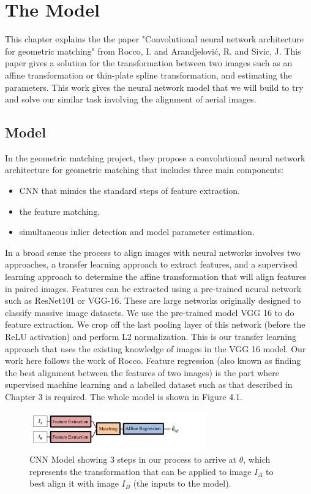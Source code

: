 \chapter{The Model}
This chapter explains the the paper "Convolutional neural network architecture for geometric matching\citep{Rocco17}" from Rocco, I. and Arandjelovi\'c, R. and Sivic, J. This paper gives a solution for the transformation between two images such as an affine transformation or thin-plate spline transformation, and estimating the parameters. This work gives the neural network model that we will build to try and solve our similar task involving the alignment of aerial images.

\section{Model}
In the geometric matching project\citep{Rocco17}, they propose a convolutional neural network architecture for geometric matching that includes three main components:
\begin{itemize}
\item CNN that mimics the standard steps of feature extraction.
\item the feature matching. 
\item simultaneous inlier detection and model parameter estimation.
\end{itemize}
  In a broad sense the process to align images with neural networks involves two approaches, a transfer learning approach to extract features, and a supervised learning approach to determine the affine transformation that will align features in paired images. Features can be extracted using a pre-trained neural network such as ResNet101\cite{dai2016r} or VGG-16\cite{simonyan2014very}. These are large networks originally designed to classify massive image datasets. We use the pre-trained model VGG 16 to do feature extraction. We crop off the last pooling layer of this network (before the ReLU activation) and perform L2 normalization. This is our transfer learning approach that uses the existing knowledge of images in the VGG 16 model. Our work here follows the work of Rocco\citep{Rocco17}. Feature regression (also known as finding the best alignment between the features of two images) is the part where supervised machine learning and a labelled dataset such as that described in Chapter 3 is required. The whole model is shown in Figure 4.1.

\begin{figure}
\centering
\includegraphics[width = 3.0in]{figs/cnn_model_aff}
\caption{CNN Model showing 3 steps in our process to arrive at $\theta$, which represents the transformation that can be applied to image $I_A$ to best align it with image $I_B$ (the inputs to the model).\cite{Rocco17}}
\end{figure}
